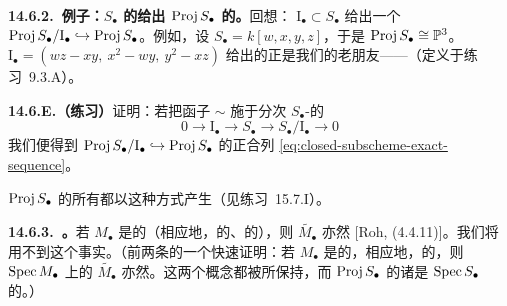 \textbf{14.6.2.\ 例子：$S_\bullet$ 的\trHomogeneous\trIdeal{}给出 $\operatorname{Proj} S_\bullet$ 的\trClosedSubscheme。}\quad 回想：\trHomogeneous\trIdeal{} $\mathrm{I}_\bullet\subset S_\bullet$ 给出一个\trClosedSubscheme{} $\operatorname{Proj} S_\bullet/\mathrm{I}_\bullet\hookrightarrow\operatorname{Proj} S_\bullet$。例如，设 $S_\bullet=k[w,x,y,z]$，于是 $\operatorname{Proj} S_\bullet\cong\mathbb{P}^3$。\trIdeal{} $\mathrm{I}_\bullet=(wz-xy,\ x^2-wy,\ y^2-xz)$ 给出的正是我们的老朋友——\trTwistedCubic（定义于\mbox{练习~9.3.A}）。

\textbf{14.6.E.（练习）}\quad 证明：若把函子 $\sim$ 施于分次 $S_\bullet$-\trModule{}的\trExactSequence
\[
0\longrightarrow\mathrm{I}_\bullet\longrightarrow S_\bullet\longrightarrow S_\bullet/\mathrm{I}_\bullet\longrightarrow 0
\]
我们便得到 $\operatorname{Proj} S_\bullet/\mathrm{I}_\bullet\hookrightarrow\operatorname{Proj} S_\bullet$ 的\trClosedSubscheme{}正合列 \eqref{eq:closed-subscheme-exact-sequence}。

$\operatorname{Proj} S_\bullet$ 的所有\trClosedSubscheme{}都以这种方式产生（见\mbox{练习~15.7.I}）。

\textbf{14.6.3.\ \trhRemark{}。}\quad 若 $M_\bullet$ 是\trFinitelyGenerated{}的（相应地，\trFinitelyPresented{}的、\trCoh{}的），则 $\widetilde{M_\bullet}$ 亦然 [Roh, (4.4.11)]。我们将用不到这个事实。（前两条的一个快速证明：若 $M_\bullet$ 是\trFinitelyGenerated{}的，相应地，\trFinitelyPresented{}的，则\trAffine\trCone{} $\operatorname{Spec} M_\bullet$ 上的\trQCSheaf{} $\widetilde{M_\bullet}$ 亦然。这两个概念都被\trPullback{}所保持，而 $\operatorname{Proj} S_\bullet$ 的诸\trStandardOpenSet{}是\trAffine\trCone{} $\operatorname{Spec} S_\bullet$ 的\trClosedSubscheme。）

